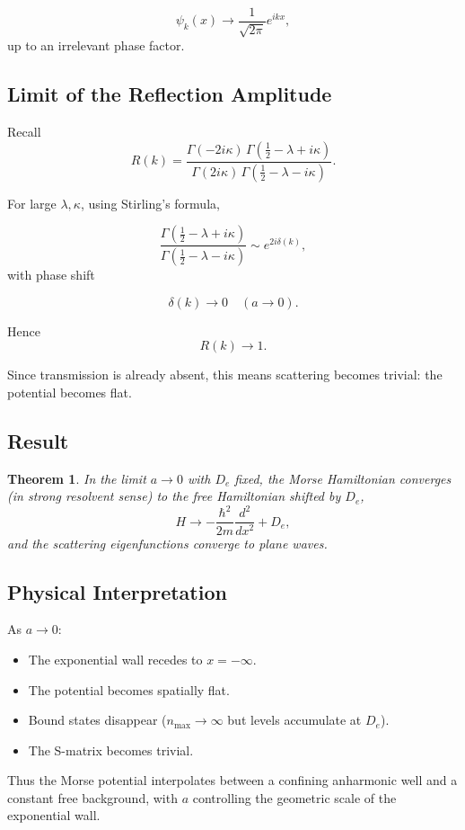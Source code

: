 \documentclass[11pt]{article}
\newtheorem{theorem}{Theorem}
\begin{document}
\[
\psi_k(x)
\longrightarrow
\frac{1}{\sqrt{2\pi}}
e^{ikx},
\]
up to an irrelevant phase factor.

\subsection{Limit of the Reflection Amplitude}

Recall
\[
R(k)=
\frac{\Gamma(-2i\kappa)
\,\Gamma(\frac12-\lambda+i\kappa)}
{\Gamma(2i\kappa)
\,\Gamma(\frac12-\lambda-i\kappa)}.
\]

For large $\lambda,\kappa$,
using Stirling’s formula,

\[
\frac{\Gamma(\frac12-\lambda+i\kappa)}
{\Gamma(\frac12-\lambda-i\kappa)}
\sim
e^{2i\delta(k)},
\]
with phase shift

\[
\delta(k) \to 0
\quad (a\to 0).
\]

Hence
\[
R(k)\to 1.
\]

Since transmission is already absent,
this means scattering becomes trivial:
the potential becomes flat.

\subsection{Result}

\begin{theorem}
In the limit $a\to 0$ with $D_e$ fixed,
the Morse Hamiltonian converges (in strong resolvent sense)
to the free Hamiltonian shifted by $D_e$,
\[
H \to -\frac{\hbar^2}{2m}\frac{d^2}{dx^2}+D_e,
\]
and the scattering eigenfunctions converge to plane waves.
\end{theorem}

\subsection{Physical Interpretation}

As $a\to 0$:

\begin{itemize}
\item The exponential wall recedes to $x=-\infty$.
\item The potential becomes spatially flat.
\item Bound states disappear ($n_{\max}\to\infty$ but
      levels accumulate at $D_e$).
\item The S-matrix becomes trivial.
\end{itemize}

Thus the Morse potential interpolates between a confining
anharmonic well and a constant free background,
with $a$ controlling the geometric scale of the exponential wall.
\end{document}

